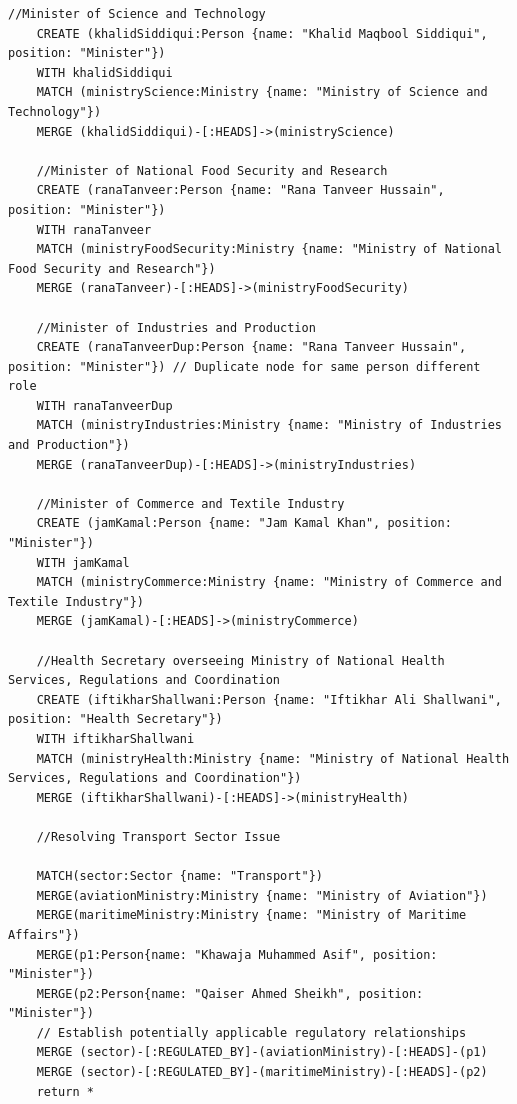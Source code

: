 \documentclass[12pt]{article}
\begin{document}
\begin{lstlisting}[frame=single]
    //Minister of Science and Technology
    CREATE (khalidSiddiqui:Person {name: "Khalid Maqbool Siddiqui", position: "Minister"})
    WITH khalidSiddiqui
    MATCH (ministryScience:Ministry {name: "Ministry of Science and Technology"})
    MERGE (khalidSiddiqui)-[:HEADS]->(ministryScience)
    
    //Minister of National Food Security and Research
    CREATE (ranaTanveer:Person {name: "Rana Tanveer Hussain", position: "Minister"})
    WITH ranaTanveer
    MATCH (ministryFoodSecurity:Ministry {name: "Ministry of National Food Security and Research"})
    MERGE (ranaTanveer)-[:HEADS]->(ministryFoodSecurity)
    
    //Minister of Industries and Production
    CREATE (ranaTanveerDup:Person {name: "Rana Tanveer Hussain", position: "Minister"}) // Duplicate node for same person different role
    WITH ranaTanveerDup
    MATCH (ministryIndustries:Ministry {name: "Ministry of Industries and Production"})
    MERGE (ranaTanveerDup)-[:HEADS]->(ministryIndustries)
    
    //Minister of Commerce and Textile Industry
    CREATE (jamKamal:Person {name: "Jam Kamal Khan", position: "Minister"})
    WITH jamKamal
    MATCH (ministryCommerce:Ministry {name: "Ministry of Commerce and Textile Industry"})
    MERGE (jamKamal)-[:HEADS]->(ministryCommerce)
    
    //Health Secretary overseeing Ministry of National Health Services, Regulations and Coordination
    CREATE (iftikharShallwani:Person {name: "Iftikhar Ali Shallwani", position: "Health Secretary"})
    WITH iftikharShallwani
    MATCH (ministryHealth:Ministry {name: "Ministry of National Health Services, Regulations and Coordination"})
    MERGE (iftikharShallwani)-[:HEADS]->(ministryHealth)

    //Resolving Transport Sector Issue

    MATCH(sector:Sector {name: "Transport"})
    MERGE(aviationMinistry:Ministry {name: "Ministry of Aviation"})
    MERGE(maritimeMinistry:Ministry {name: "Ministry of Maritime Affairs"})
    MERGE(p1:Person{name: "Khawaja Muhammed Asif", position: "Minister"})
    MERGE(p2:Person{name: "Qaiser Ahmed Sheikh", position: "Minister"})
    // Establish potentially applicable regulatory relationships
    MERGE (sector)-[:REGULATED_BY]-(aviationMinistry)-[:HEADS]-(p1)
    MERGE (sector)-[:REGULATED_BY]-(maritimeMinistry)-[:HEADS]-(p2)
    return *
\end{lstlisting}
\end{document}
